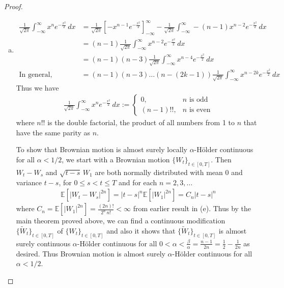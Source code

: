 \documentclass[a4paper,12pt]{article}
\theoremstyle{definition}
\begin{document}
\begin{proof}
\begin{enumerate}[(a)]
\item
\begin{align*}
\frac{1}{\sqrt{2\pi}}\int_{-\infty}^{\infty}x^ne^{-\frac{x^2}{2}}\,dx&=\frac{1}{\sqrt{2\pi}}\left[-x^{n-1}e^{-\frac{x^2}{2}}\right]_{-\infty}^{\infty}-\frac{1}{\sqrt{2\pi}}\int_{-\infty}^{\infty}-(n-1)x^{n-2}e^{-\frac{x^2}{2}}\,dx\\
&=(n-1)\frac{1}{\sqrt{2\pi}}\int_{-\infty}^{\infty}x^{n-2}e^{-\frac{x^2}{2}}\,dx\\
&=(n-1)(n-3)\frac{1}{\sqrt{2\pi}}\int_{-\infty}^{\infty}x^{n-4}e^{-\frac{x^2}{2}}\,dx\\
\text{In general, } &=(n-1)(n-3)\ldots(n-(2k-1))\frac{1}{\sqrt{2\pi}}\int_{-\infty}^{\infty}x^{n-2k}e^{-\frac{x^2}{2}}\,dx
\end{align*}
Thus we have
\begin{align*}
\frac{1}{\sqrt{2\pi}}\int_{-\infty}^{\infty}x^ne^{-\frac{x^2}{2}}\,dx :=\begin{cases}
0, & \text{$n$ is odd}\\
(n-1)!! , & \text{$n$ is even}
\end{cases}
\end{align*}
where $n!!$ is the double factorial, the product of all numbers from 1 to $n$ that have the same parity as $n$.


To show that Brownian motion is almost surely locally $\alpha$-H\"{o}lder continuous for all $\alpha<1/2$, we start with a Brownian motion $\{W_t\}_{t\in[0,T]}$. Then $W_t-W_s$ and $\sqrt{t-s}\,W_1$ are both normally distributed with mean 0 and variance $t-s$, for $0 \leq s < t \leq T$ and for each $n=2,3,\ldots$
\begin{align*}
\mathbb{E}\left[|W_t-W_s|^{2n}\right] = |t-s|^n\mathbb{E}\left[|W_1|^{2n}\right]=C_n|t-s|^n
\end{align*}
where $C_n = \mathbb{E}\left[|W_1|^{2n}\right] = \frac{(2n)!}{2^n\,n!}<\infty$ from earlier result in (e). Thus by the main theorem proved above, we can find a continuous modification $\{\widetilde{W}_t\}_{t\in [0,T]}$ of $\{W_t\}_{t\in[0,T]}$ and also it shows that $\{\widetilde{W}_t\}_{t\in [0,T]}$ is almost surely continuous $\alpha$-H\"{o}lder continuous for all $0<\alpha<\frac{\beta}{\alpha} = \frac{n-1}{2n} = \frac{1}{2}-\frac{1}{2n}$ as desired. Thus Brownian motion is almost surely $\alpha$-H\"{o}lder continuous for all $\alpha < 1/2$.
%
%
%

\end{enumerate}

\end{proof}
\end{document}
